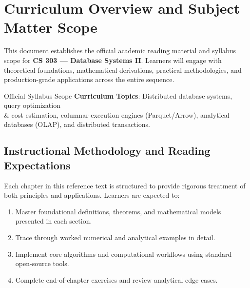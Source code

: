 \section{Curriculum Overview and Subject Matter Scope}

This document establishes the official academic reading material and syllabus scope for \textbf{CS 303 --- Database Systems II}. Learners will engage with theoretical foundations, mathematical derivations, practical methodologies, and production-grade applications across the entire sequence.

\begin{InsightBox}{Official Syllabus Scope}
  \textbf{Curriculum Topics}: Distributed database systems, query optimization \\& cost estimation, columnar execution engines (Parquet/Arrow), analytical databases (OLAP), and distributed transactions.
\end{InsightBox}

\subsection{Instructional Methodology and Reading Expectations}

Each chapter in this reference text is structured to provide rigorous treatment of both principles and applications. Learners are expected to:
\begin{enumerate}
  \item Master foundational definitions, theorems, and mathematical models presented in each section.
  \item Trace through worked numerical and analytical examples in detail.
  \item Implement core algorithms and computational workflows using standard open-source tools.
  \item Complete end-of-chapter exercises and review analytical edge cases.
\end{enumerate}

